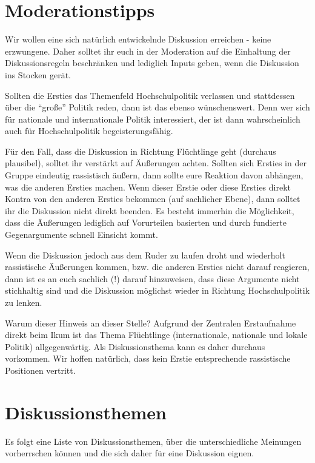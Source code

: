 \documentclass[a4paper,11pt]{scrartcl} %
\begin{document}
\section{Moderationstipps}

Wir wollen eine sich natürlich entwickelnde Diskussion erreichen - keine erzwungene. Daher solltet
ihr euch in der Moderation auf die Einhaltung der Diskussionsregeln beschränken und lediglich Inputs
geben, wenn die Diskussion ins Stocken gerät.

Sollten die Ersties das Themenfeld Hochschulpolitik verlassen und stattdessen über die "`große"'
Politik reden, dann ist das ebenso wünschenswert. Denn wer sich für nationale und internationale
Politik interessiert, der ist dann wahrscheinlich auch für Hochschulpolitik begeisterungsfähig.

Für den Fall, dass die Diskussion in Richtung Flüchtlinge geht (durchaus plausibel), solltet ihr 
verstärkt auf Äußerungen achten. Sollten sich Ersties in der Gruppe eindeutig rassistisch äußern,
dann sollte eure Reaktion davon abhängen, was die anderen Ersties machen. Wenn dieser Erstie oder
diese Ersties direkt Kontra von den anderen Ersties bekommen (auf sachlicher Ebene), dann solltet
ihr die Diskussion nicht direkt beenden. Es besteht immerhin die Möglichkeit, dass die Äußerungen
lediglich auf Vorurteilen basierten und durch fundierte Gegenargumente schnell Einsicht kommt.

Wenn die Diskussion jedoch aus dem Ruder zu laufen droht und wiederholt rassistische Äußerungen kommen,
bzw. die anderen Ersties nicht darauf reagieren, dann ist es an euch sachlich (!) darauf hinzuweisen,
dass diese Argumente nicht stichhaltig sind und die Diskussion möglichst wieder in Richtung
Hochschulpolitik zu lenken.

Warum dieser Hinweis an dieser Stelle? Aufgrund der Zentralen Erstaufnahme direkt beim Ikum
ist das Thema Flüchtlinge (internationale, nationale und lokale Politik) allgegenwärtig.
Als Diskussionsthema kann es daher durchaus vorkommen. Wir hoffen natürlich, dass kein Erstie
entsprechende rassistische Positionen vertritt.


\section{Diskussionsthemen}

Es folgt eine Liste von Diskussionsthemen, über die unterschiedliche Meinungen vorherrschen können
und die sich daher für eine Diskussion eignen.
\end{document}
